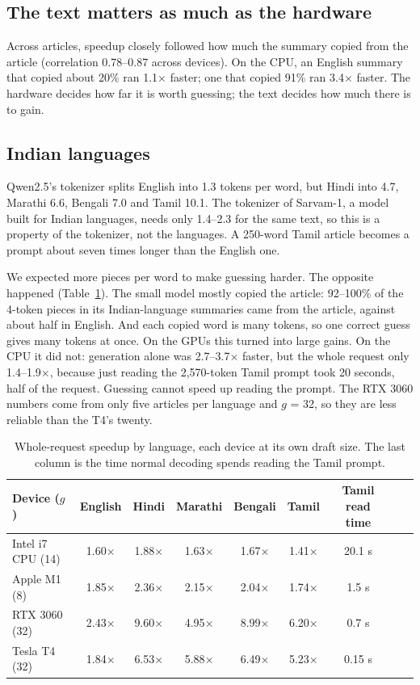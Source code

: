 \documentclass{article}
\newcommand{\tms}{\ensuremath{\times}}
\begin{document}
\subsection{The text matters as much as the hardware}

Across articles, speedup closely followed how much the summary copied from the article (correlation 0.78--0.87 across devices).
On the CPU, an English summary that copied about 20\% ran 1.1\tms{} faster; one that copied 91\% ran 3.4\tms{} faster.
The hardware decides how far it is worth guessing; the text decides how much there is to gain.

\subsection{Indian languages}

Qwen2.5's tokenizer splits English into 1.3 tokens per word, but Hindi into 4.7, Marathi 6.6, Bengali 7.0 and Tamil 10.1.
The tokenizer of Sarvam-1, a model built for Indian languages, needs only 1.4--2.3 for the same text, so this is a property of the tokenizer, not the languages.
A 250-word Tamil article becomes a prompt about seven times longer than the English one.

We expected more pieces per word to make guessing harder.
The opposite happened (Table~\ref{tab:lang}).
The small model mostly copied the article: 92--100\% of the 4-token pieces in its Indian-language summaries came from the article, against about half in English.
And each copied word is many tokens, so one correct guess gives many tokens at once.
On the GPUs this turned into large gains.
On the CPU it did not: generation alone was 2.7--3.7\tms{} faster, but the whole request only 1.4--1.9\tms{}, because just reading the 2,570-token Tamil prompt took 20 seconds, half of the request.
Guessing cannot speed up reading the prompt.
The RTX 3060 numbers come from only five articles per language and $g$ = 32, so they are less reliable than the T4's twenty.

\begin{table}[t]
\centering
\small
\caption{Whole-request speedup by language, each device at its own draft size. The last column is the time normal decoding spends reading the Tamil prompt.}
\label{tab:lang}
\begin{tabular}{lcccccccc}
\toprule
Device ($g$) & English & Hindi & Marathi & Bengali & Tamil & Tamil read time \\
\midrule
Intel i7 CPU (14) & 1.60\tms & 1.88\tms & 1.63\tms & 1.67\tms & 1.41\tms & 20.1 s \\
Apple M1 (8)      & 1.85\tms & 2.36\tms & 2.15\tms & 2.04\tms & 1.74\tms & 1.5 s \\
RTX 3060 (32)     & 2.43\tms & 9.60\tms & 4.95\tms & 8.99\tms & 6.20\tms & 0.7 s \\
Tesla T4 (32)     & 1.84\tms & 6.53\tms & 5.88\tms & 6.49\tms & 5.23\tms & 0.15 s \\
\bottomrule
\end{tabular}
\end{table}
\end{document}
